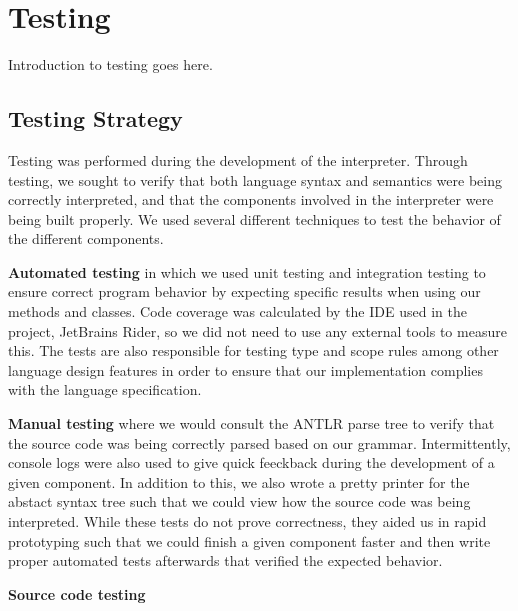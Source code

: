 \chapter{Testing}

Introduction to testing goes here.

\section{Testing Strategy}
Testing was performed during the development of the \dazel{} interpreter. 
Through testing, we sought to verify that both language syntax and semantics were being correctly interpreted, and that the components involved in the interpreter were being built properly.
We used several different techniques to test the behavior of the different components. 

\textbf{Automated testing} in which we used unit testing and integration testing to ensure correct program behavior by expecting specific results when using our methods and classes. 
Code coverage was calculated by the IDE used in the project, JetBrains Rider, so we did not need to use any external tools to measure this\cite{rider_test_coverage}.
The tests are also responsible for testing type and scope rules among other language design features in order to ensure that our implementation complies with the language specification.

\textbf{Manual testing} where we would consult the ANTLR parse tree to verify that the source code was being correctly parsed based on our grammar. 
Intermittently, console logs were also used to give quick feeckback during the development of a given component.
In addition to this, we also wrote a pretty printer for the abstact syntax tree such that we could view how the source code was being interpreted.
While these tests do not prove correctness, they aided us in rapid prototyping such that we could finish a given component faster and then write proper automated tests afterwards that verified the expected behavior.  

\textbf{Source code testing}

